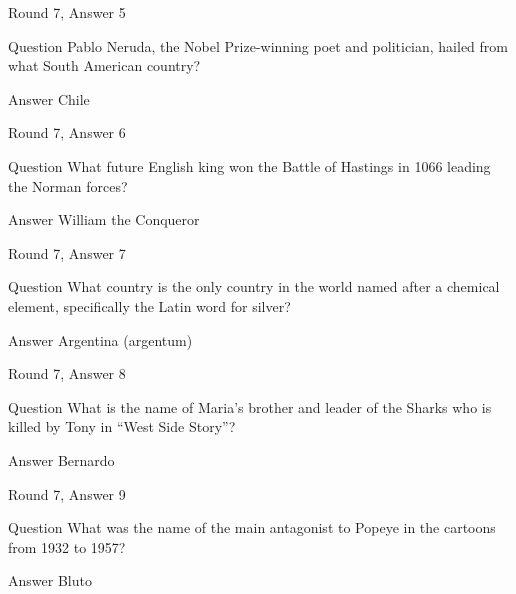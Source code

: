 \documentclass[11pt]{beamer}
\begin{document}
\begin{frame}{Round 7, Answer 5}
\begin{block}{Question}
Pablo Neruda, the Nobel Prize-winning poet and politician, hailed from what South American country\@?
\end{block}
\pause{}
\begin{block}{Answer}
Chile
\end{block}
\end{frame}
    

\begin{frame}{Round 7, Answer 6}
\begin{block}{Question}
What future English king won the Battle of Hastings in 1066 leading the Norman forces\@?
\end{block}
\pause{}
\begin{block}{Answer}
William the Conqueror
\end{block}
\end{frame}
    

\begin{frame}{Round 7, Answer 7}
\begin{block}{Question}
What country is the only country in the world named after a chemical element, specifically the Latin word for silver\@?
\end{block}
\pause{}
\begin{block}{Answer}
Argentina (argentum)
\end{block}
\end{frame}
    

\begin{frame}{Round 7, Answer 8}
\begin{block}{Question}
What is the name of Maria's brother and leader of the Sharks who is killed by Tony in ``West Side Story''\@?
\end{block}
\pause{}
\begin{block}{Answer}
Bernardo
\end{block}
\end{frame}
    

\begin{frame}{Round 7, Answer 9}
\begin{block}{Question}
What was the name of the main antagonist to Popeye in the cartoons from 1932 to 1957\@?
\end{block}
\pause{}
\begin{block}{Answer}
Bluto
\end{block}
\end{frame}
    
\end{document}
